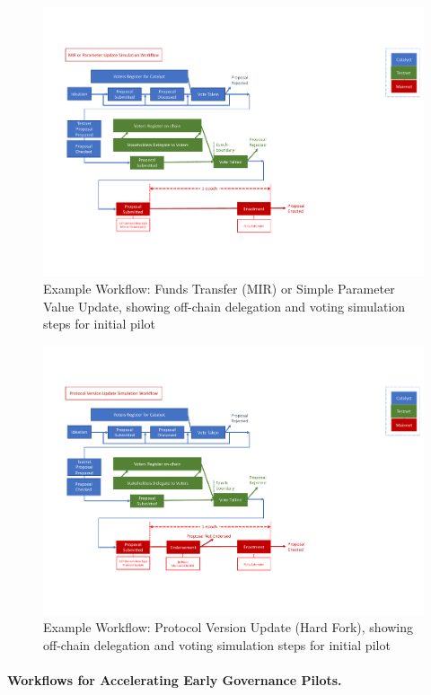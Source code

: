 \begin{figure}
  \includegraphics[trim=0 90 0 80,clip,width=\textwidth]{Workflow1}
  \caption{Example Workflow: Funds Transfer (MIR) or Simple Parameter Value Update, showing off-chain delegation and voting simulation steps for initial pilot}
  \label{fig:workflow-mir2}
\end{figure}

\begin{figure}
  \includegraphics[trim=0 90 0 80,clip,width=\textwidth]{Workflow2}
  \caption{Example Workflow: Protocol Version Update (Hard Fork), showing off-chain delegation and voting simulation steps for initial pilot}
  \label{fig:workflow-hf2}
\end{figure}

\paragraph{Workflows for Accelerating Early Governance Pilots.}


